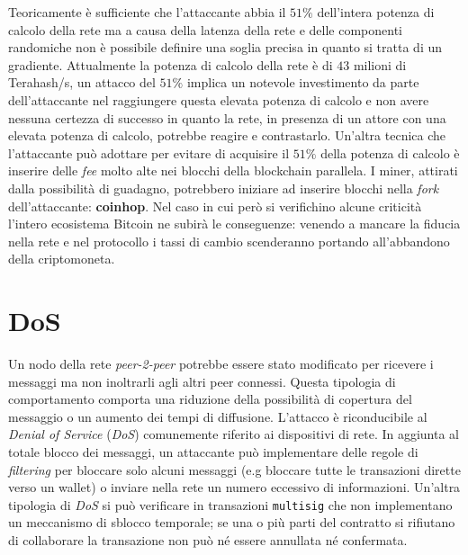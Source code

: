 Teoricamente è sufficiente che l'attaccante abbia il $51\%$ dell'intera potenza di calcolo della rete ma a causa della latenza della rete e delle componenti randomiche non è possibile definire una soglia precisa in quanto si tratta di un gradiente.\newline
Attualmente la potenza di calcolo della rete è di $43$ milioni di Terahash/s, un attacco del $51\%$ implica un notevole investimento da parte dell'attaccante nel raggiungere questa elevata potenza di calcolo e non avere nessuna certezza di successo in quanto la rete, in presenza di un attore con una elevata potenza di calcolo, potrebbe reagire e contrastarlo. Un'altra tecnica che l'attaccante può adottare per evitare di acquisire il $51\%$ della potenza di calcolo è inserire delle \textit{fee} molto alte nei blocchi della blockchain parallela. I miner, attirati dalla possibilità di guadagno, potrebbero iniziare ad inserire blocchi nella \textit{fork} dell'attaccante: \textbf{coinhop}.\newline
Nel caso in cui però si verifichino alcune criticità l'intero ecosistema Bitcoin ne subirà le conseguenze: venendo a mancare la fiducia nella rete e nel protocollo i tassi di cambio scenderanno portando all'abbandono della criptomoneta.\newline

\section{DoS}
Un nodo della rete \textit{peer-2-peer} potrebbe essere stato modificato per ricevere i messaggi ma non inoltrarli agli altri peer connessi. Questa tipologia di comportamento comporta una riduzione della possibilità di copertura del messaggio o un aumento dei tempi di diffusione. L'attacco è riconducibile al \textit{Denial of Service} (\textit{DoS}) comunemente riferito ai dispositivi di rete.\newline
In aggiunta al totale blocco dei messaggi, un attaccante può implementare delle regole di \textit{filtering} per bloccare solo alcuni messaggi (e.g bloccare tutte le transazioni dirette verso un wallet) o inviare nella rete un numero eccessivo di informazioni.\newline
Un'altra tipologia di \textit{DoS} si può verificare in transazioni \texttt{multisig} che non implementano un meccanismo di sblocco temporale; se una o più parti del contratto si rifiutano di collaborare la transazione non può né essere annullata né confermata.


